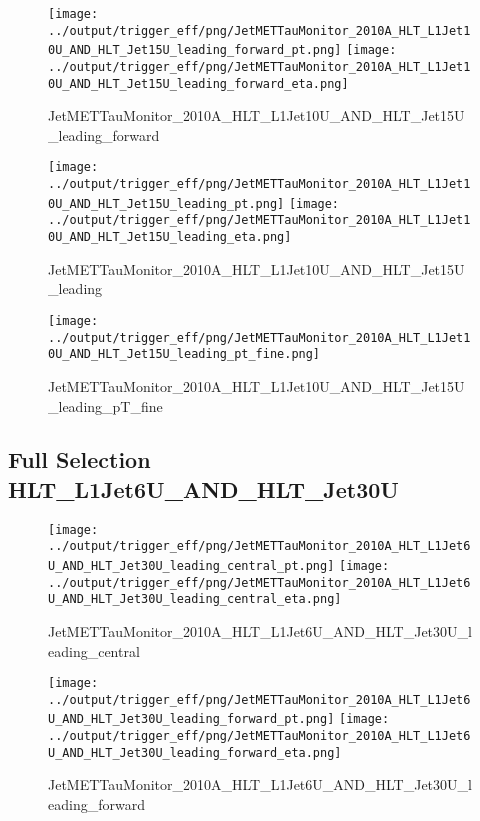 \documentclass[11pt]{article}
\begin{document}
\begin{figure}[ht]
\centering
\texttt{[image: ../output/trigger\_eff/png/JetMETTauMonitor\_2010A\_HLT\_L1Jet10U\_AND\_HLT\_Jet15U\_leading\_forward\_pt.png]}
\texttt{[image: ../output/trigger\_eff/png/JetMETTauMonitor\_2010A\_HLT\_L1Jet10U\_AND\_HLT\_Jet15U\_leading\_forward\_eta.png]}
\caption{JetMETTauMonitor\_2010A\_HLT\_L1Jet10U\_AND\_HLT\_Jet15U\_leading\_forward}
\label{fig:jetmettaumon_HLT_L1Jet10U_AND_HLT_Jet15U_leading_forward}
\end{figure}

\begin{figure}[ht]
\centering
\texttt{[image: ../output/trigger\_eff/png/JetMETTauMonitor\_2010A\_HLT\_L1Jet10U\_AND\_HLT\_Jet15U\_leading\_pt.png]}
\texttt{[image: ../output/trigger\_eff/png/JetMETTauMonitor\_2010A\_HLT\_L1Jet10U\_AND\_HLT\_Jet15U\_leading\_eta.png]}
\caption{JetMETTauMonitor\_2010A\_HLT\_L1Jet10U\_AND\_HLT\_Jet15U\_leading}
\label{fig:jetmettaumon_HLT_L1Jet10U_AND_HLT_Jet15U_leading}
\end{figure}

\begin{figure}[ht]
\centering
\texttt{[image: ../output/trigger\_eff/png/JetMETTauMonitor\_2010A\_HLT\_L1Jet10U\_AND\_HLT\_Jet15U\_leading\_pt\_fine.png]}
\caption{JetMETTauMonitor\_2010A\_HLT\_L1Jet10U\_AND\_HLT\_Jet15U\_leading\_pT\_fine}
\label{fig:jetmettaumon_HLT_L1Jet10U_AND_HLT_Jet15U_leading_pT_fine}
\end{figure}
\clearpage


\newpage
\subsection{Full Selection HLT\_L1Jet6U\_AND\_HLT\_Jet30U}
\begin{figure}[ht]
\centering
\texttt{[image: ../output/trigger\_eff/png/JetMETTauMonitor\_2010A\_HLT\_L1Jet6U\_AND\_HLT\_Jet30U\_leading\_central\_pt.png]}
\texttt{[image: ../output/trigger\_eff/png/JetMETTauMonitor\_2010A\_HLT\_L1Jet6U\_AND\_HLT\_Jet30U\_leading\_central\_eta.png]}
\caption{JetMETTauMonitor\_2010A\_HLT\_L1Jet6U\_AND\_HLT\_Jet30U\_leading\_central}
\label{fig:jetmettaumon_HLT_L1Jet6U_AND_HLT_Jet30U_leading_central}
\end{figure}

\begin{figure}[ht]
\centering
\texttt{[image: ../output/trigger\_eff/png/JetMETTauMonitor\_2010A\_HLT\_L1Jet6U\_AND\_HLT\_Jet30U\_leading\_forward\_pt.png]}
\texttt{[image: ../output/trigger\_eff/png/JetMETTauMonitor\_2010A\_HLT\_L1Jet6U\_AND\_HLT\_Jet30U\_leading\_forward\_eta.png]}
\caption{JetMETTauMonitor\_2010A\_HLT\_L1Jet6U\_AND\_HLT\_Jet30U\_leading\_forward}
\label{fig:jetmettaumon_HLT_L1Jet6U_AND_HLT_Jet30U_leading_forward}
\end{figure}
\end{document}
